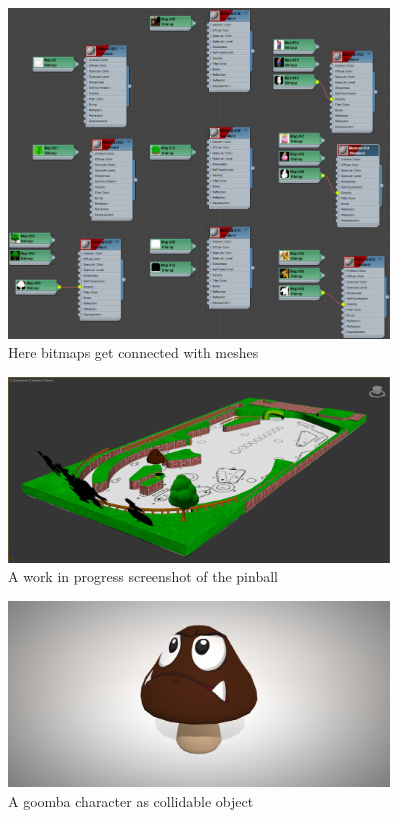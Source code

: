 \documentclass[11.5pt,oneside,a4paper]{scrartcl}
\newcounter{ct}
\begin{document}
\begin{figure}
	\centering
	\includegraphics[width=0.90\textwidth]{texturing.jpg}
	\caption{Here bitmaps get connected with meshes}
	\label{fig:texturing}
	\vspace{0.1cm}
\end{figure}

\begin{figure}
	\centering
	\includegraphics[width=0.90\textwidth]{pinballinprogress.jpg}
	\caption{A work in progress screenshot of the pinball}
	\label{fig:pinballinprogress}
	\vspace{0.1cm}
\end{figure}

\begin{figure}
	\centering
	\includegraphics[width=0.90\textwidth]{goomba.jpg}
	\caption{A goomba character as collidable object}
	\label{fig:goomba}
	\vspace{0.1cm}
\end{figure}
\end{document}
